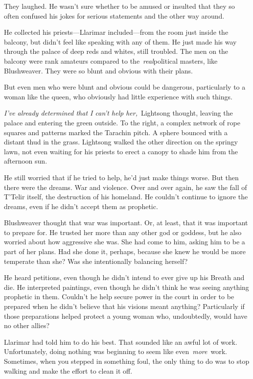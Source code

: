 They laughed. He wasn’t sure whether to be amused or insulted that they so often confused his jokes for serious statements and the other way around.

He collected his priests—Llarimar included—from the room just inside the balcony, but didn’t feel like speaking with any of them. He just made his way through the palace of deep reds and whites, still troubled. The men on the balcony were rank amateurs compared to the~\textit{real}political masters, like Blushweaver. They were so blunt and obvious with their plans.

But even men who were blunt and obvious could be dangerous, particularly to a woman like the queen, who obviously had little experience with such things.

\textit{I’ve already determined that I can’t help her,}~Lightsong thought, leaving the palace and entering the green outside. To the right, a complex network of rope squares and patterns marked the Tarachin pitch. A sphere bounced with a distant thud in the grass. Lightsong walked the other direction on the springy lawn, not even waiting for his priests to erect a canopy to shade him from the afternoon sun.

He still worried that if he tried to help, he’d just make things worse. But then there were the dreams. War and violence. Over and over again, he saw the fall of T’Telir itself, the destruction of his homeland. He couldn’t continue to ignore the dreams, even if he didn’t accept them as prophetic.

Blushweaver thought that war was important. Or, at least, that it was important to prepare for. He trusted her more than any other god or goddess, but he also worried about how aggressive she was. She had come to him, asking him to be a part of her plans. Had she done it, perhaps, because she knew he would be more temperate than she? Was she intentionally balancing herself?

He heard petitions, even though he didn’t intend to ever give up his Breath and die. He interpreted paintings, even though he didn’t think he was seeing anything prophetic in them. Couldn’t he help secure power in the court in order to be prepared when he didn’t believe that his visions meant anything? Particularly if those preparations helped protect a young woman who, undoubtedly, would have no other allies?

Llarimar had told him to do his best. That sounded like an awful lot of work. Unfortunately, doing nothing was beginning to seem like even~\textit{more}~work. Sometimes, when you stepped in something foul, the only thing to do was to stop walking and make the effort to clean it off.

